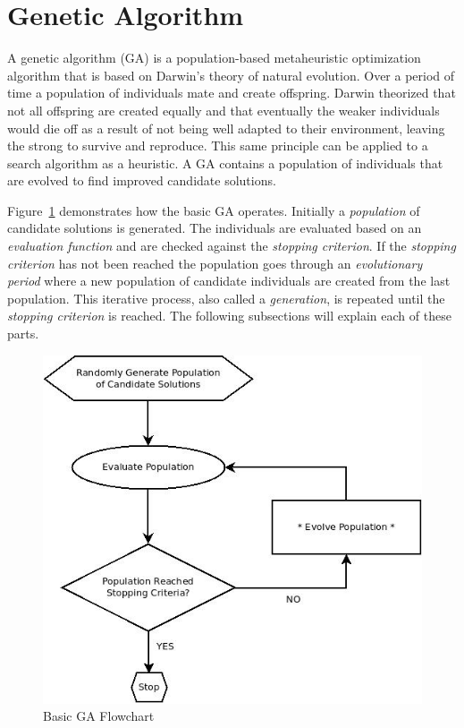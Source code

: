 \section{Genetic Algorithm}
\label{sec:ea}

A genetic algorithm (GA) is a population-based metaheuristic optimization algorithm that is based on Darwin's theory of natural evolution. Over a period of time a population of individuals mate and create offspring. Darwin theorized that not all offspring are created equally and that eventually the weaker individuals would die off as a result of not being well adapted to their environment, leaving the strong to survive and reproduce. This same principle can be applied to a search algorithm as a heuristic. A GA contains a population of individuals that are evolved to find improved candidate solutions.

Figure~\ref{fig:evolutionaryFlowchart} demonstrates how the basic GA operates. Initially a \textit{population} of candidate solutions is generated. The individuals are evaluated based on an \textit{evaluation function} and are checked against the \textit{stopping criterion}. If the \textit{stopping criterion} has not been reached the population goes through an \textit{evolutionary period} where a new population of candidate individuals are created from the last population. This iterative process, also called a \textit{generation}, is repeated until the \textit{stopping criterion} is reached. The following subsections will explain each of these parts.

\begin{figure}[H]
	\centering
	\includegraphics[bb=0 0 524 481,scale=0.5]{figures/EA.jpeg}
	\caption{Basic GA Flowchart}
	\label{fig:evolutionaryFlowchart}
\end{figure}

